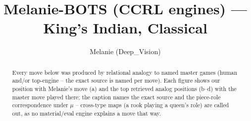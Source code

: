 \documentclass[11pt]{article}
\title{Melanie-BOTS (CCRL engines) — King's Indian, Classical}
\author{Melanie (Deep\_Vision)}
\date{}
\begin{document}
\maketitle

\begin{abstract}Every move below was produced by relational analogy to named master games (human and/or top-engine -- the exact source is named per move). Each figure shows our position with Melanie's move (a) and the top retrieved analog positions (b--d) with the master move played there; the caption names the exact source and the piece-role correspondence under $\mu$ -- cross-type maps (a rook playing a queen's role) are called out, as no material/eval engine explains a move that way.\end{abstract}

\begin{figure}[p]\centering
\begin{subfigure}{0.46\textwidth}\centering
\resizebox{\linewidth}{!}{%
\newchessgame
\chessboard[
  setfen={rnbq1rk1/ppp2pbp/3p1np1/4p3/2PPP3/2N2N2/PP2BPPP/R1BQK2R w KQ - 0 7},
  showmover=false,
  pgfstyle=straightmove, color=movearrow, markmove={e1-g1}
]}
\caption{}
\end{subfigure}\hfill
\begin{subfigure}{0.46\textwidth}\centering
\resizebox{\linewidth}{!}{%
\newchessgame
\chessboard[
  setfen={rnbq1rk1/ppp2pbp/3p1np1/4p3/2PPP3/2N2N2/PP2BPPP/R1BQK2R w KQ - 0 7},
  showmover=false,
  pgfstyle=straightmove, color=movearrow, markmove={e1-g1}
]}
\caption{}
\end{subfigure}
\\[4pt]
\begin{subfigure}{0.46\textwidth}\centering
\resizebox{\linewidth}{!}{%
\newchessgame
\chessboard[
  setfen={rnbq1rk1/ppp2pbp/3p1np1/4p3/2PPP3/2N2N2/PP2BPPP/R1BQK2R w KQ - 0 7},
  showmover=false,
  pgfstyle=straightmove, color=movearrow, markmove={e1-g1}
]}
\caption{}
\end{subfigure}\hfill
\begin{subfigure}{0.46\textwidth}\centering
\resizebox{\linewidth}{!}{%
\newchessgame
\chessboard[
  setfen={rnbq1rk1/ppp2pbp/3p1np1/4p3/2PPP3/2N2N2/PP2BPPP/R1BQK2R w KQ - 0 7},
  showmover=false,
  pgfstyle=straightmove, color=movearrow, markmove={e1-g1}
]}
\caption{}
\end{subfigure}

\end{figure}
\end{document}
